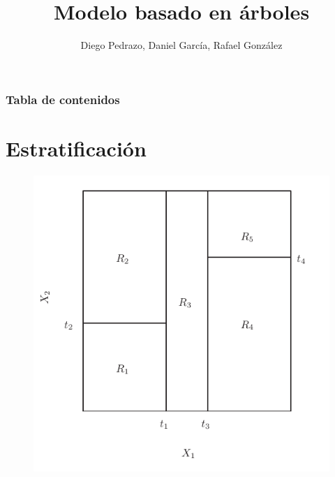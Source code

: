\documentclass{beamer}
\title{Modelo basado en árboles}
\author{Diego Pedrazo, Daniel García, Rafael González}
\institute{Universidad de Sevilla}
\date{}
\theoremstyle{definition}
\begin{document}
\frame{\titlepage}

\begin{frame}
\frametitle{Tabla de contenidos}
\tableofcontents
\end{frame}

\section{Estratificación}

\begin{frame}
\begin{figure}[h!]
\includegraphics[scale=0.4]{regiones}
\end{figure}
\end{frame}
\end{document}
